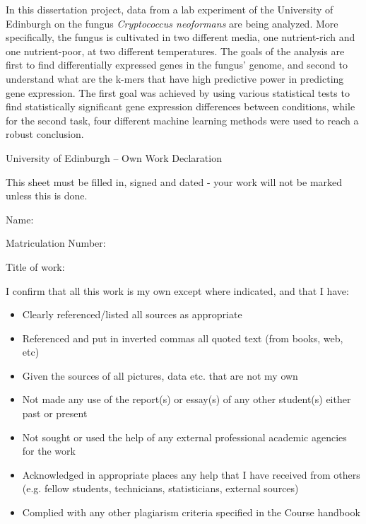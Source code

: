\documentclass[11pt,twoside]{article}
\numberwithin{Theorem}{section}
\numberwithin{Definition}{section}
\numberwithin{Lemma}{section}
\numberwithin{Algorithm}{section}
\numberwithin{equation}{section}
\newcommand{\dottedline}[1]{\makebox[#1]{.\dotfill}}
\begin{document}
In this dissertation project, data from a lab experiment of the University of Edinburgh on the fungus \emph{Cryptococcus neoformans} are being analyzed. More specifically, the fungus is cultivated in two different media, one nutrient-rich and one nutrient-poor, at two different temperatures. The goals of the analysis are first to find differentially expressed genes in the fungus' genome, and second to understand what are the k-mers that have high predictive power in predicting gene expression. The first goal was achieved by using various statistical tests to find statistically significant gene expression differences between conditions, while for the second task, four different machine learning methods were used to reach a robust conclusion.

\clearpage

\begin{center}
\Large{University of Edinburgh – Own Work Declaration}
\end{center}


This sheet must be filled in, signed and dated - your work will not be marked unless this is done.
\vspace{1cm}

Name: \dottedline{8cm}

Matriculation Number: \dottedline{6cm}

Title of work: \dottedline{8cm}

\vspace{1cm}

I confirm that all this work is my own except where indicated, and that I have:
\begin{itemize}
\item	Clearly referenced/listed all sources as appropriate	 				
\item	Referenced and put in inverted commas all quoted text (from books, web, etc)	
\item	Given the sources of all pictures, data etc. that are not my own				
\item	Not made any use of the report(s) or essay(s) of any other student(s) either past 	
or present	
\item	Not sought or used the help of any external professional academic agencies for the work
\item	Acknowledged in appropriate places any help that I have received from others	(e.g. fellow students, technicians, statisticians, external sources)
\item	Complied with any other plagiarism criteria specified in the Course handbook
\end{itemize}
\end{document}
